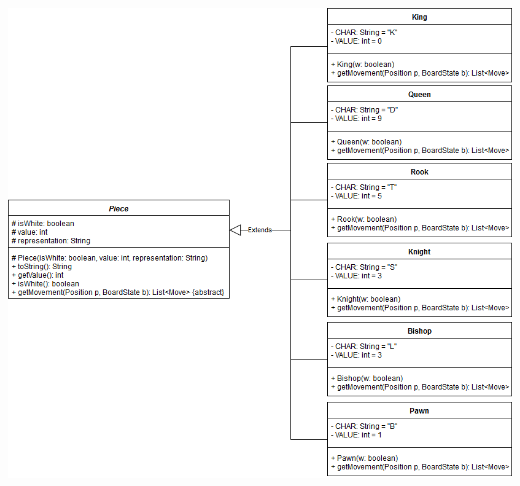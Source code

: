 \documentclass[parskip=full]{scrartcl}
\begin{document}
		\begin{minipage}{\linewidth}
		\centering
		\includegraphics[width=1\linewidth]{Diagramme/Pieces}
		\label{fig:pieces}
		\end{minipage}
\end{document}
